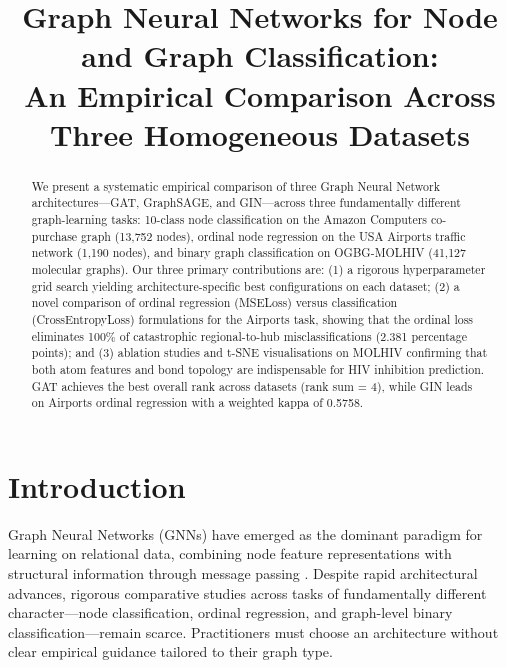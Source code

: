 \documentclass[conference]{IEEEtran}
\begin{document}
\title{Graph Neural Networks for Node and Graph Classification:\\
An Empirical Comparison Across Three Homogeneous Datasets}

\author{
}

\maketitle

\begin{abstract}
We present a systematic empirical comparison of three Graph Neural Network architectures---GAT, GraphSAGE, and GIN---across three fundamentally different graph-learning tasks: 10-class node classification on the Amazon Computers co-purchase graph (13,752 nodes), ordinal node regression on the USA Airports traffic network (1,190 nodes), and binary graph classification on OGBG-MOLHIV (41,127 molecular graphs). Our three primary contributions are: (1) a rigorous hyperparameter grid search yielding architecture-specific best configurations on each dataset; (2) a novel comparison of ordinal regression (MSELoss) versus classification (CrossEntropyLoss) formulations for the Airports task, showing that the ordinal loss eliminates 100\% of catastrophic regional-to-hub misclassifications (2.381 percentage points); and (3) ablation studies and t-SNE visualisations on MOLHIV confirming that both atom features and bond topology are indispensable for HIV inhibition prediction. GAT achieves the best overall rank across datasets (rank sum = 4), while GIN leads on Airports ordinal regression with a weighted kappa of 0.5758.
\end{abstract}

\section{Introduction}

Graph Neural Networks (GNNs) have emerged as the dominant paradigm for learning on relational data, combining node feature representations with structural information through message passing \cite{gilmer2017}. Despite rapid architectural advances, rigorous comparative studies across tasks of fundamentally different character---node classification, ordinal regression, and graph-level binary classification---remain scarce. Practitioners must choose an architecture without clear empirical guidance tailored to their graph type.
\end{document}
